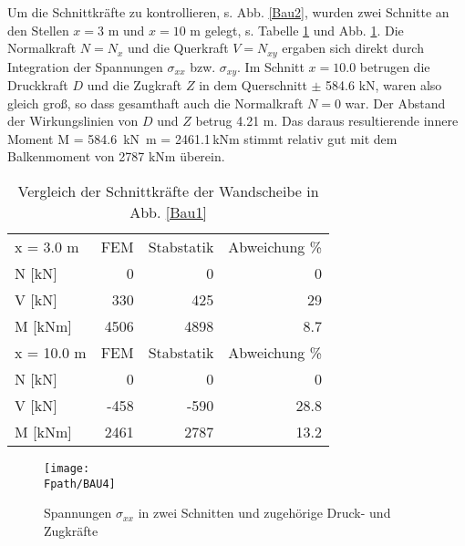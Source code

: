 {Um die Schnittkr\"{a}fte zu kontrollieren, s. Abb. \ref{Bau2}, wurden zwei Schnitte an den Stellen $x = 3$ m und $x = 10$ m gelegt, s. Tabelle \ref{TabNQMBau1} und Abb. \ref{Bau4}. Die Normalkraft $N = N_{x}$ und die Querkraft $V = N_{xy}$ ergaben sich direkt durch Integration der Spannungen $\sigma_{xx}$ bzw. $\sigma_{xy}$. Im Schnitt $x = 10.0$  betrugen die Druckkraft $D$ und die Zugkraft $Z$ in dem Querschnitt $\pm$ 584.6 kN, waren also gleich gro{\ss}, so dass gesamthaft auch die Normalkraft $N = 0$ war. Der Abstand der Wirkungslinien von $D$ und $Z$ betrug 4.21 m. Das daraus resultierende innere Moment
\bfoo
M = 584.6 \,\mbox{kN} \,\mbox{m} = 2461.1\,\mbox{kNm}
\efoo
stimmt relativ gut mit dem Balkenmoment von 2787 kNm \"{u}berein.
\begin{table}[tbp] \centering
\caption{ Vergleich der Schnittkr\"{a}fte der Wandscheibe in Abb. \ref{Bau1}}
\label{TabNQMBau1}
\begin{tabular}{lrrr}
\noalign{\hrule\smallskip}
 x = 3.0 m &        FEM & Stabstatik & Abweichung \% \\
   N  [kN] &          0 &          0 &          0 \\
    V [kN] &        330 &        425 &         29 \\
   M [kNm] &       4506 &       4898 &        8.7 \\
\noalign{\hrule\smallskip}
 x = 10.0 m &        FEM & Stabstatik & Abweichung \% \\
   N  [kN] &          0 &          0 &          0 \\
    V [kN] &       -458 &       -590 &       28.8 \\
   M [kNm] &       2461 &       2787 &       13.2 \\
\end{tabular}
\end{table}
\begin{figure}[tbp] \centering
\if {} \sidecaption \fi
\texttt{[image: \\Fpath/BAU4]}
\caption{Spannungen $\sigma_{xx}$ in zwei Schnitten und zugeh\"{o}rige Druck- und Zugkr\"{a}fte}
\label{Bau4}
\end{figure}%

}
